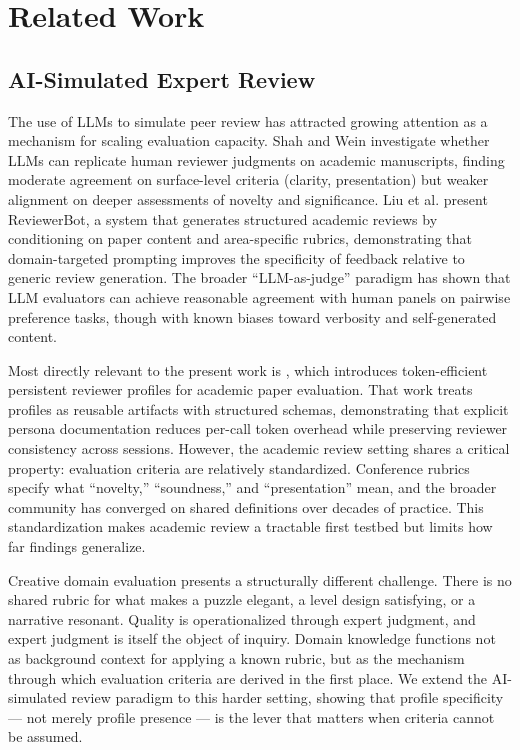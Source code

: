 \section{Related Work}

\subsection{AI-Simulated Expert Review}

The use of LLMs to simulate peer review has attracted growing attention as a mechanism for scaling evaluation capacity. Shah and Wein \cite{shah2023shah2023} investigate whether LLMs can replicate human reviewer judgments on academic manuscripts, finding moderate agreement on surface-level criteria (clarity, presentation) but weaker alignment on deeper assessments of novelty and significance. Liu et al. \cite{liu2023reviewerbot} present ReviewerBot, a system that generates structured academic reviews by conditioning on paper content and area-specific rubrics, demonstrating that domain-targeted prompting improves the specificity of feedback relative to generic review generation. The broader ``LLM-as-judge'' paradigm \cite{zheng2023judging} has shown that LLM evaluators can achieve reasonable agreement with human panels on pairwise preference tasks, though with known biases toward verbosity and self-generated content.

Most directly relevant to the present work is \citet{dellaLibera2025profiles}, which introduces token-efficient persistent reviewer profiles for academic paper evaluation. That work treats profiles as reusable artifacts with structured schemas, demonstrating that explicit persona documentation reduces per-call token overhead while preserving reviewer consistency across sessions. However, the academic review setting shares a critical property: evaluation criteria are relatively standardized. Conference rubrics specify what ``novelty,'' ``soundness,'' and ``presentation'' mean, and the broader community has converged on shared definitions over decades of practice. This standardization makes academic review a tractable first testbed but limits how far findings generalize.

Creative domain evaluation presents a structurally different challenge. There is no shared rubric for what makes a puzzle elegant, a level design satisfying, or a narrative resonant. Quality is operationalized through expert judgment, and expert judgment is itself the object of inquiry. Domain knowledge functions not as background context for applying a known rubric, but as the mechanism through which evaluation criteria are derived in the first place. We extend the AI-simulated review paradigm to this harder setting, showing that profile specificity --- not merely profile presence --- is the lever that matters when criteria cannot be assumed.


